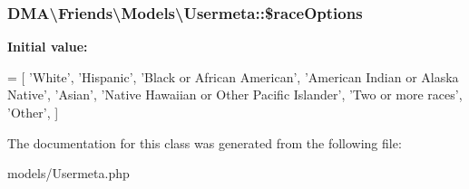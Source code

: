 \hypertarget{classDMA_1_1Friends_1_1Models_1_1Usermeta_a652b8516026050339b28058afc851d3e}{
\subsubsection[{\$race\+Options}]{\setlength{\rightskip}{0pt plus 5cm}D\+M\+A\textbackslash{}\+Friends\textbackslash{}\+Models\textbackslash{}\+Usermeta\+::\$race\+Options\hspace{0.3cm}{\ttfamily [static]}}}\label{classDMA_1_1Friends_1_1Models_1_1Usermeta_a652b8516026050339b28058afc851d3e}
{\bfseries Initial value\+:}
\begin{DoxyCode}
= [
        \textcolor{stringliteral}{'White'},
        \textcolor{stringliteral}{'Hispanic'},
        \textcolor{stringliteral}{'Black or African American'},
        \textcolor{stringliteral}{'American Indian or Alaska Native'},
        \textcolor{stringliteral}{'Asian'},
        \textcolor{stringliteral}{'Native Hawaiian or Other Pacific Islander'},
        \textcolor{stringliteral}{'Two or more races'},
        \textcolor{stringliteral}{'Other'},
    ]
\end{DoxyCode}


The documentation for this class was generated from the following file\+:\begin{DoxyCompactItemize}
\item 
models/Usermeta.\+php\end{DoxyCompactItemize}
